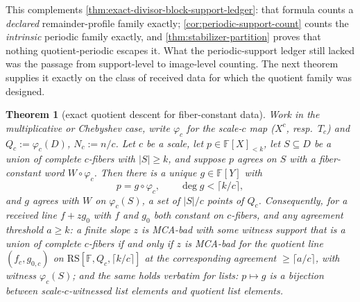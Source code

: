 \documentclass[11pt]{article}
\newtheorem{theorem}{Theorem}[section]
\theoremstyle{definition}
\theoremstyle{remark}
\newcommand{\F}{\mathbb{F}}
\newcommand{\RS}{\mathrm{RS}}
\begin{document}
This complements \cref{thm:exact-divisor-block-support-ledger}: that formula counts a \emph{declared} remainder-profile family exactly; \cref{cor:periodic-support-count} counts the \emph{intrinsic} periodic family exactly, and \cref{thm:stabilizer-partition} proves that nothing quotient-periodic escapes it. What the periodic-support ledger still lacked was the passage from support-level to image-level counting. The next theorem supplies it exactly on the class of received data for which the quotient family was designed.

\begin{theorem}[exact quotient descent for fiber-constant data]\label{thm:fiber-descent}
Work in the multiplicative or Chebyshev case, write $\varphi_c$ for the scale-$c$ map \textup($X^c$, resp.\ $T_c$\textup) and $Q_c:=\varphi_c(D)$, $N_c:=n/c$. Let $c$ be a scale, let $p\in\F[X]_{<k}$, let $S\subseteq D$ be a union of complete $c$-fibers with $|S|\ge k$, and suppose $p$ agrees on $S$ with a fiber-constant word $W\circ\varphi_c$. Then there is a unique $g\in\F[Y]$ with
\[
p=g\circ\varphi_c,\qquad \deg g<\lceil k/c\rceil,
\]
and $g$ agrees with $W$ on $\varphi_c(S)$, a set of $|S|/c$ points of $Q_c$. Consequently, for a received line $f+zg_0$ with $f$ and $g_0$ both constant on $c$-fibers, and any agreement threshold $a\ge k$: a finite slope $z$ is MCA-bad with some witness support that is a union of complete $c$-fibers if and only if $z$ is MCA-bad for the quotient line $(f_c,g_{0,c})$ on $\RS[\F,Q_c,\lceil k/c\rceil]$ at the corresponding agreement $\ge\lceil a/c\rceil$, with witness $\varphi_c(S)$; and the same holds verbatim for lists: $p\mapsto g$ is a bijection between scale-$c$-witnessed list elements and quotient list elements.
\end{theorem}
\end{document}
